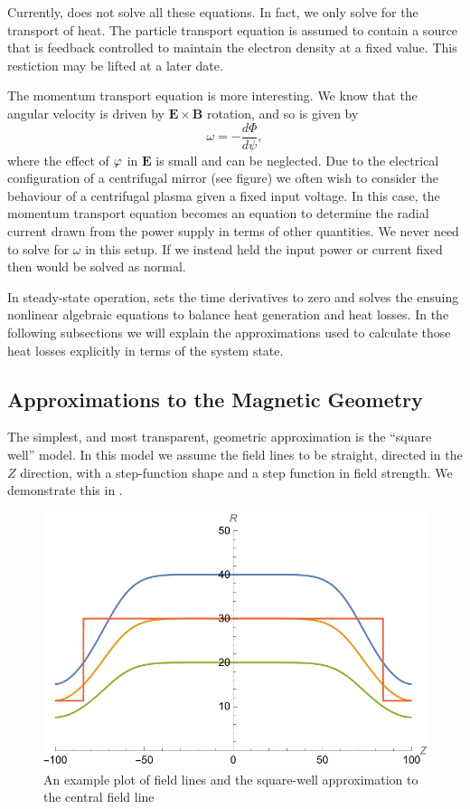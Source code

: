 \documentclass{revtex4}
\begin{document}
Currently, \mctrans{} does not solve all these equations. In fact, we only solve for the transport of heat. The particle transport equation is assumed to contain a 
source that is feedback controlled to maintain the electron density at a fixed value. This restiction may be lifted at a later date.

The momentum transport equation is more interesting. We know that the angular velocity is driven by $\bm{E}\times\bm{B}$ rotation, and so is given by
\begin{equation}
\omega = - \frac{d \Phi}{d\psi},
\end{equation}
where the effect of $\varphi$ in $\bm{E}$ is small and can be neglected.  Due to the electrical configuration of a centrifugal mirror (see figure) we often
wish to consider the behaviour of a centrifugal plasma given a fixed input voltage. In this case, the momentum transport equation becomes an equation to determine
the radial current drawn from the power supply in terms of other quantities. We never need to solve  for $\omega$ in this setup. If we instead held the input power or current fixed then  would be solved as normal.

In steady-state operation, \mctrans{} sets the time derivatives to zero and solves the ensuing nonlinear algebraic equations to balance heat generation and heat losses.
In the following subsections we will explain the approximations used to calculate those heat losses explicitly in terms of the system state.

\subsection{Approximations to the Magnetic Geometry}
The simplest, and most transparent, geometric approximation is the ``square well'' model. In this model we assume the field lines to be straight, directed in the $Z$ direction, with a step-function shape and a step function in field strength. We demonstrate this in .
\begin{figure}
\includegraphics{SquareWell.pdf}
\caption{An example plot of field lines and the square-well approximation to the central field line}
\label{squarewellplot}
\end{figure}
\end{document}
